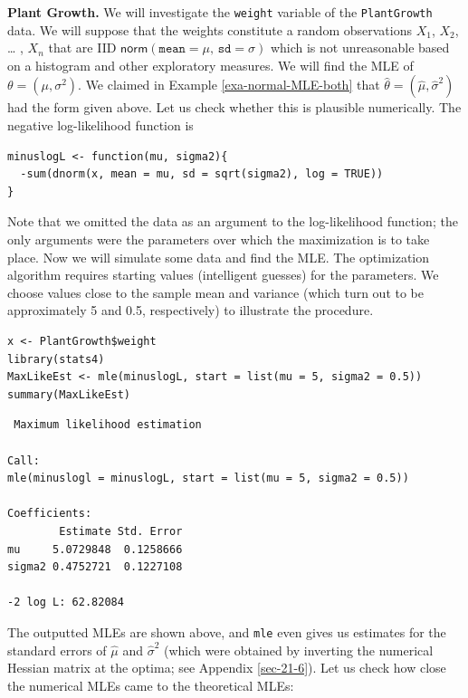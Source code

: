\documentclass[captions=tableheading]{scrbook}
\begin{document}
\begin{example}

\textbf{Plant Growth.} We will investigate the \texttt{weight} variable of the \texttt{PlantGrowth} data. We will suppose that the weights constitute a random observations \(X_{1}\), \(X_{2}\), \ldots{} , \(X_{n}\) that are IID \(\mathsf{norm}(\mathtt{mean}=\mu,\,\mathtt{sd}=\sigma)\) which is not unreasonable based on a histogram and other exploratory measures. We will find the MLE of \(\theta=(\mu,\sigma^{2})\). We claimed in Example \ref{exa-normal-MLE-both} that \(\hat{\theta}=(\hat{\mu},\hat{\sigma}^{2})\) had the form given above. Let us check whether this is plausible numerically. The negative log-likelihood function is


\lstset{language=R}
\begin{lstlisting}
minuslogL <- function(mu, sigma2){
  -sum(dnorm(x, mean = mu, sd = sqrt(sigma2), log = TRUE))
}
\end{lstlisting}

Note that we omitted the data as an argument to the log-likelihood function; the only arguments were the parameters over which the maximization is to take place. Now we will simulate some data and find the MLE. The optimization algorithm requires starting values (intelligent guesses) for the parameters. We choose values close to the sample mean and variance (which turn out to be approximately 5 and 0.5, respectively) to illustrate the procedure.


\lstset{language=R}
\begin{lstlisting}
x <- PlantGrowth$weight
library(stats4)
MaxLikeEst <- mle(minuslogL, start = list(mu = 5, sigma2 = 0.5))
summary(MaxLikeEst)
\end{lstlisting}


\begin{verbatim}
 Maximum likelihood estimation

Call:
mle(minuslogl = minuslogL, start = list(mu = 5, sigma2 = 0.5))

Coefficients:
        Estimate Std. Error
mu     5.0729848  0.1258666
sigma2 0.4752721  0.1227108

-2 log L: 62.82084
\end{verbatim}

The outputted MLEs are shown above, and \texttt{mle} even gives us estimates for the standard errors of \(\hat{\mu}\) and \(\hat{\sigma}^{2}\) (which were obtained by inverting the numerical Hessian matrix at the optima; see Appendix \ref{sec-21-6}). Let us check how close the numerical MLEs came to the theoretical MLEs:



\end{example}
\end{document}
